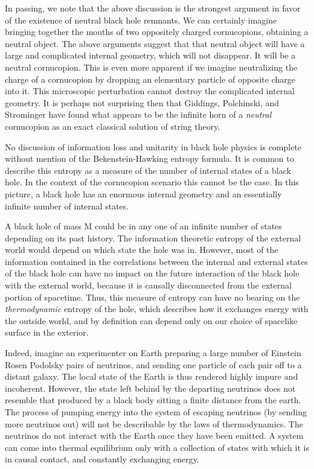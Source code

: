 In passing, we note that
the above discussion is the strongest argument in favor of the existence of
neutral black hole remnants.  We can certainly imagine bringing together the
mouths of two oppositely charged cornucopions, obtaining a neutral object.
The above arguments suggest that that neutral object will have a large and
complicated internal geometry, which will not disappear.  It will be a neutral
cornucopion.  This is even more apparent if we imagine neutralizing the
charge of a cornucopion by dropping an elementary particle of opposite
charge into it.  This microscopic perturbation cannot destroy the
complicated internal geometry.  It is perhaps not surprising then that
Giddings, Polchinski, and Strominger have found what appears to be the
infinite horn of a {\it neutral} cornucopion as an exact classical
solution of string theory\gidpostro .


No discussion of information loss and unitarity in black hole physics is
complete without
mention of the Bekenstein-Hawking entropy formula.  It is common to
describe this
entropy as a measure of the number of internal states of a black hole.
In the
context
of the cornucopion scenario this cannot be the case.  In this picture, a
black hole has an
enormous internal geometry and an essentially infinite number of
internal states.

A black hole of
mass M could be in any one of an infinite number of states depending on
its past history.  The information theoretic entropy of the external
world would depend on which state the hole was in.  However, most of the
information contained in the correlations between the internal and
external states of the black hole can have no impact on the future
interaction of the black hole with the external world, because it is
causally disconnected from the external portion of spacetime.
  Thus, this measure of entropy can
have no bearing on the {\it thermodynamic} entropy of the hole, which
describes how it exchanges energy with the outside world, and by
definition can depend only on our choice of spacelike surface in the
exterior.

Indeed, imagine an experimenter on Earth preparing a large number of
Einstein Rosen Podolsky pairs of neutrinos, and sending
one particle of each pair off to a distant galaxy.  The local state of the
Earth is thus rendered highly impure and incoherent.  However, the state
left behind by the departing neutrinos does not resemble that
produced by a black body sitting a finite distance from the earth.
The process of
pumping energy into the system of escaping neutrinos
(by sending more neutrinos out) will not be describable by the
laws of thermodynamics.  The neutrinos do not interact with the Earth
once they have been emitted.  A system can come into thermal equilibrium
only with a collection of states with which it is in causal contact, and
constantly exchanging energy.

